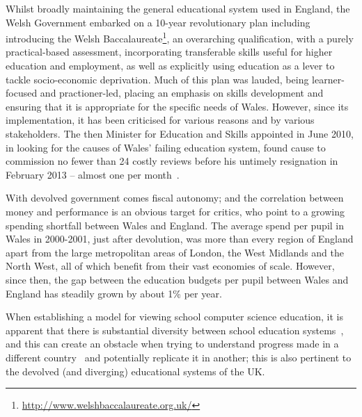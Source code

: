 \documentclass{llncs}
\begin{document}
Whilst broadly maintaining the general educational system used in
England, the Welsh Government embarked on a 10-year revolutionary plan
including %
introducing the Welsh
Baccalaureate\footnote{\url{http://www.welshbaccalaureate.org.uk/}},
an overarching qualification, with a purely practical-based
assessment, incorporating transferable skills useful for higher
education and employment, as well as explicitly using education as a
lever to tackle socio-economic deprivation. Much of this plan was
lauded, being learner-focused and practioner-led, placing an emphasis
on skills development and ensuring that it is appropriate for the
specific needs of Wales. However, since its implementation, it has
been criticised for various reasons and by various stakeholders.  The
then Minister for Education and Skills appointed in June 2010, in
looking for the causes of Wales' failing education system, found cause
to commission no fewer than 24 costly reviews before his untimely
resignation in February 2013 -- almost one per
month~\cite{Evans:2015}.

With devolved government comes fiscal autonomy; and the
correlation between money and performance is an obvious target for
critics, who point to a growing spending shortfall between Wales and
England.  The average spend per pupil in Wales in 2000-2001, just
after devolution, was more than every region of England apart from
the large metropolitan areas of London, the West Midlands and the
North West, all of which benefit from their vast economies of scale.
However, since then, the gap between the education budgets per pupil
between Wales and England has steadily grown by about 1\% per year.

When establishing a model for viewing school computer science
education, it is apparent that there is substantial diversity between
school education
systems~\cite{hubwieser-et-al:2011,schulte-et-al:2012,snyder:2012},
and this can create an obstacle when trying to understand progress
made in a different country~\cite{armonia+gal-ezerb:2014} and
potentially replicate it in another; this is also pertinent to the
devolved (and diverging) educational systems of the UK.

\end{document}
